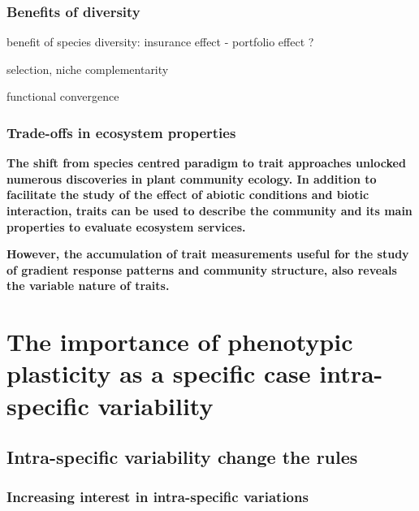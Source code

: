 \subsection{Benefits of diversity}

benefit of species diversity: insurance effect - portfolio effect ?

selection, niche complementarity

functional convergence

\textbf{}

\subsection{Trade-offs in ecosystem properties}


\textbf{}


\textbf{The shift from species centred paradigm to trait approaches unlocked numerous discoveries in plant community ecology. In addition to facilitate the study of the effect of abiotic conditions and biotic interaction, traits can be used to describe the community and its main properties to evaluate ecosystem services.}

\textbf{However, the accumulation of trait measurements useful for the study of gradient response patterns and community structure, also reveals the variable nature of traits.}



\chapter{The importance of phenotypic plasticity as a specific case intra-specific variability}

\section{Intra-specific variability change the rules}

\subsection{Increasing interest in intra-specific variations}
